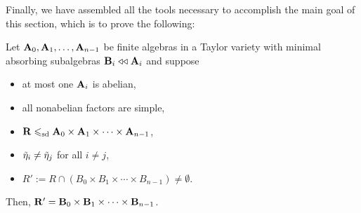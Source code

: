 Finally, we have assembled all the tools necessary to accomplish the main goal of this section,
which is to prove the following:
\begin{theorem}
\label{thm:rectangularity}
Let $\mathbf{A}_0, \mathbf{A}_1, \dots, \mathbf{A}_{n-1}$ be finite algebras in a
Taylor variety with minimal absorbing subalgebras 
$\mathbf{B}_i \mathrel{\triangleleft\triangleleft} \mathbf{A}_i$
and suppose
\begin{itemize}
\item at most one $\mathbf{A}_i$ is abelian,
\item all nonabelian factors are simple, 
\item $\mathbf{R} \leqslant_{\mathrm{sd}} \mathbf{A}_0 \times \mathbf{A}_1 \times \cdots \times \mathbf{A}_{n-1}$,
\item $\tilde{\eta}_i \neq \tilde{\eta}_j$ for all $i\neq j$, %
\item $R':= R \cap (B_0 \times B_1 \times \cdots \times B_{n-1}) \neq \emptyset$.
\end{itemize}
Then, $\mathbf{R}' = \mathbf{B}_0 \times \mathbf{B}_1 \times \cdots \times \mathbf{B}_{n-1}$. %
\end{theorem}


